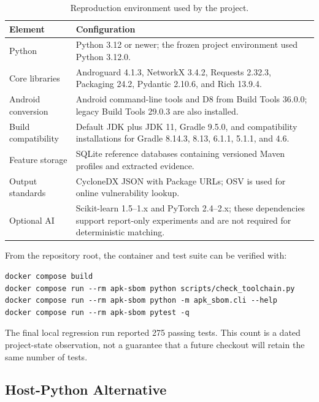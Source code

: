 \begin{table}[H]
\centering
\caption{Reproduction environment used by the project.}
\label{tab:appendix-runtime}
\begin{tabularx}{\textwidth}{L{0.28\textwidth}X}
\toprule
\textbf{Element} & \textbf{Configuration}\\
\midrule
Python & Python 3.12 or newer; the frozen project environment used Python
3.12.0.\\
Core libraries & Androguard 4.1.3, NetworkX 3.4.2, Requests 2.32.3,
Packaging 24.2, Pydantic 2.10.6, and Rich 13.9.4.\\
Android conversion & Android command-line tools and D8 from Build Tools
36.0.0; legacy Build Tools 29.0.3 are also installed.\\
Build compatibility & Default JDK plus JDK 11, Gradle 9.5.0, and compatibility
installations for Gradle 8.14.3, 8.13, 6.1.1, 5.1.1, and 4.6.\\
Feature storage & SQLite reference databases containing versioned Maven
profiles and extracted evidence.\\
Output standards & CycloneDX JSON with Package URLs; OSV is used for online
vulnerability lookup.\\
Optional AI & Scikit-learn 1.5--1.x and PyTorch 2.4--2.x; these dependencies
support report-only experiments and are not required for deterministic
matching.\\
\bottomrule
\end{tabularx}
\end{table}

From the repository root, the container and test suite can be verified with:

\begin{lstlisting}[style=thesiscode,
caption={Docker build and verification sequence.}]
docker compose build
docker compose run --rm apk-sbom python scripts/check_toolchain.py
docker compose run --rm apk-sbom python -m apk_sbom.cli --help
docker compose run --rm apk-sbom pytest -q
\end{lstlisting}

The final local regression run reported 275 passing tests. This count is a
dated project-state observation, not a guarantee that a future checkout will
retain the same number of tests.

\subsection{Host-Python Alternative}

